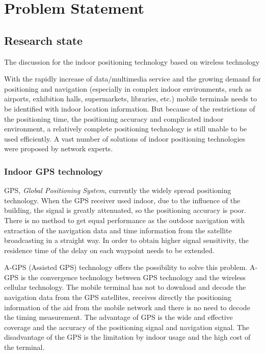 \newpage
\chapter{Problem Statement}



\section{Research state}

The discussion for the indoor positioning technology based on wireless technology

With the rapidly increase of data/multimedia service and the growing demand for positioning and navigation (especially in complex indoor environments, such as airports, exhibition halls, supermarkets, libraries, etc.) mobile terminals needs to be identified with indoor location information. But because of the restrictions of the positioning time, the positioning accuracy and complicated indoor environment, a relatively complete positioning technology is still unable to be used efficiently. A vast number of solutions of indoor positioning technologies were proposed by network experts.


\subsection{Indoor GPS technology}

GPS, \textit{Global Positioning System}, currently the widely spread positioning technology. When the GPS receiver used indoor, due to the influence of the building, the signal is greatly attenuated, so the positioning accuracy is poor. There is no method to get equal performance as the outdoor navigation with extraction of the navigation data and time information from the satellite broadcasting in a straight way. In order to obtain higher signal sensitivity, the residence time of the delay on each waypoint needs to be extended.   

A-GPS (Assisted GPS) technology offers the possibility to solve this problem. A-GPS is the convergence technology between GPS technology and the wireless cellular technology. The mobile terminal has not to download and decode the navigation data from the GPS satellites, receives directly the positioning information of the aid from the mobile network and there is no need to decode the timing measurement.
The advantage of GPS is the wide and effective coverage and the accuracy of the positioning signal and navigation signal. The disadvantage of the GPS is the limitation by indoor usage and the high cost of the terminal.  


